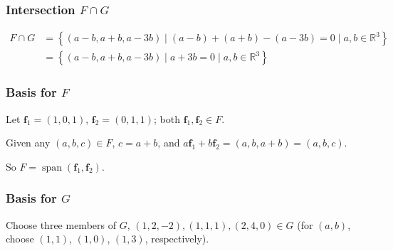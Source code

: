 \documentclass[11pt]{article}
\newcommand{\R}{\mathbb{R}}
\newcommand{\vect}[1]{\bm{#1}}      %
\newcommand{\set}[1]{\left\{#1\right\}}                  %
\DeclareMathOperator{\Span}{span}
\theoremstyle{definition}
\theoremstyle{plain}
\theoremstyle{remark}
\begin{document}
\begin{enumerate}
          \subsubsection*{Intersection $F \cap G$}
          \[
              \begin{aligned}
                  F \cap G
                   & = \set{
                      (a - b, a + b, a - 3b)
                      \mid (a - b) + (a + b) - (a - 3b) = 0
                      \mid a, b \in \R^3
                  }
                  \\
                   & = \set{
                      (a - b, a + b, a - 3b)
                      \mid a + 3b = 0
                      \mid a, b \in \R^3
                  }
              \end{aligned}
          \]

          \subsubsection*{Basis for $F$}

          Let $\vect{f}_1 = (1, 0, 1)$, $\vect{f}_2 = (0, 1, 1)$; both $\vect{f}_1,\vect{f}_2 \in F$.

          Given any $(a, b, c) \in F$, $c = a + b$, and $a \vect{f}_1 + b \vect{f}_2 = (a, b, a + b) = (a, b, c)$.

          So $F = \Span ( \vect{f}_1, \vect{f}_2 )$.

          \subsubsection*{Basis for $G$}

          Choose three members of $G$, $(1, 2, -2), (1, 1, 1), (2, 4, 0) \in G$ (for $(a, b)$, choose $(1, 1)$, $(1, 0)$,
          $(1, 3)$, respectively).


\end{enumerate}
\end{document}
